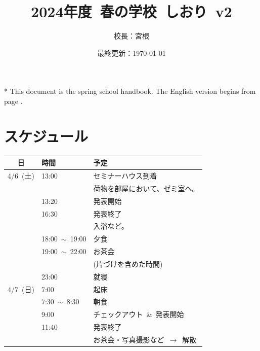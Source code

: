 \documentclass[unicode,a4paper,11pt]{ltjsarticle}
\title{
    2024年度\ 春の学校\ しおり\ v2
}
\author{
  校長：宮根
}
\date{最終更新：\today}
\begin{document}
\maketitle

* This document is the spring school handbook. The English version begins from page \pageref{eng_page}.

\tableofcontents



\clearpage

\section{スケジュール}

\begin{center}
  \begin{tabular}{cll}\hline
    日        & 時間                 & 予定                                      \\ \hline
    4/6\ (土) & 13:00                & セミナーハウス到着                        \\
              &                      & 荷物を部屋において、ゼミ室へ。            \\
              & 13:20                & 発表開始                                  \\
              & 16:30                & 発表終了                                  \\
              &                      & 入浴など。                                \\
              & 18:00\ $\sim$\ 19:00 & 夕食                                      \\
              & 19:00\ $\sim$\ 22:00 & お茶会                                      \\
              &                      & (片づけを含めた時間)                      \\
              & 23:00                & 就寝                                      \\ \hline
    4/7\ (日) & 7:00                 & 起床                                      \\
              & 7:30\ $\sim$\  8:30  & 朝食                                      \\
              & 9:00                 & チェックアウト\ \&\ 発表開始              \\
              & 11:40                & 発表終了                                  \\
              &                      & お茶会・写真撮影など\ $\rightarrow$\ 解散 \\ \hline
  \end{tabular}
\end{center}
\end{document}
